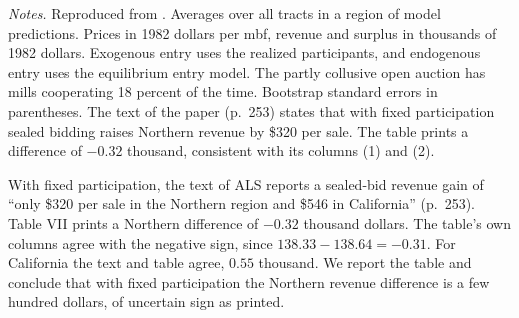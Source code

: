 \begin{table}[htbp]
\smallskip
\begin{minipage}{\linewidth}
\footnotesize\textit{Notes.} Reproduced from \citet[Table VII]{AtheyLevinSeira2011}. Averages over all
tracts in a region of model predictions. Prices in 1982 dollars per mbf, revenue and surplus in thousands
of 1982 dollars. Exogenous entry uses the realized participants, and endogenous entry uses the equilibrium
entry model. The partly collusive open auction has mills cooperating 18 percent of the time. Bootstrap
standard errors in parentheses. The text of the paper (p.~253) states that with fixed participation sealed
bidding raises Northern revenue by \$320 per sale. The table prints a difference of $-0.32$ thousand,
consistent with its columns (1) and (2).
\end{minipage}
\end{table}

With fixed participation, the text of ALS reports a sealed-bid revenue gain of ``only \$320 per sale in
the Northern region and \$546 in California'' (p.~253).
Table VII prints a Northern difference of $-0.32$ thousand dollars. The table's own columns agree with the
negative sign, since $138.33-138.64=-0.31$. For California the text and table agree, $0.55$ thousand. We
report the table and conclude that with fixed participation the Northern revenue difference is a few
hundred dollars, of uncertain sign as printed.

